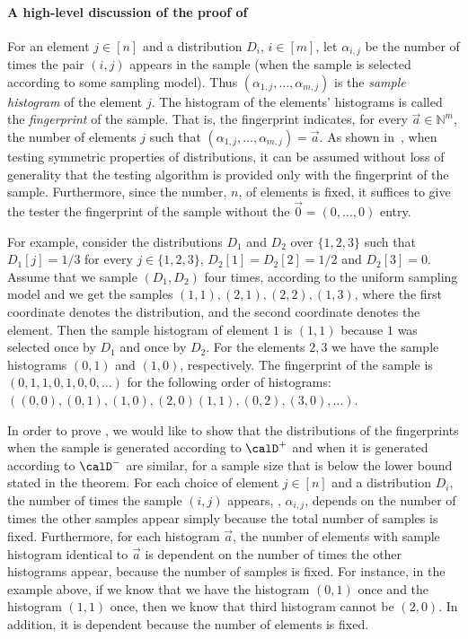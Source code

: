 \paragraph{A high-level discussion of the proof of }
For an element $j \in [n]$ and a distribution $D_i$,
$i \in[m]$, let $\alpha_{i,j}$ be the number of times the pair $(i,j)$ appears in the sample
(when the sample is selected according to some sampling model).
Thus $(\alpha_{1, j}, \ldots, \alpha_{m, j})$ is the \emph{sample histogram} of the element $j$.
The histogram of the elements' histograms is called the
\emph{fingerprint} of the sample. That is, the fingerprint indicates,
for every $\vec{a} \in \mathbb{N}^m$, the number of elements $j$ such
that $(\alpha_{1, j}, \ldots, \alpha_{m, j}) = \vec{a}$.
\sloppy
As shown in~\cite{BFRSW-long},
%
 when testing symmetric properties of distributions, it can be assumed without loss of
generality that the testing algorithm is provided only with the
fingerprint of the sample.
%
%
Furthermore, since the number, $n$, of elements is fixed,
it suffices to give the tester the fingerprint
of the sample without the $\vec{0} = (0,\ldots,0)$ entry.

For example, consider the distributions $D_1$ and $D_2$ over $\{1,2,3\}$ such that $D_1[j] = 1/3$ for every $j\in \{1,2,3\}$, $D_2[1]=D_2[2] = 1/2$ and $D_2[3] = 0$. Assume that we sample $(D_1, D_2)$ four times, according to the uniform sampling model and we get the samples $(1,1), (2,1), (2,2), (1,3)$, where the first coordinate
denotes the distribution, and the second coordinate denotes the element.
Then the sample histogram of element $1$ is $(1,1)$ because $1$ was selected once by $D_1$ and once by $D_2$. For the elements $2,3$ we have the sample histograms $(0,1)$  and $(1,0)$, respectively. The fingerprint of the sample is $(0,1,1,0,1,0,0,\ldots)$ for the following order of histograms: $((0,0), (0,1), (1,0), (2,0) (1,1), (0,2), (3,0), \ldots)$.

%
\smallskip
In order to prove , we would like to show that
the distributions of the fingerprints when the sample is generated according
to $\calD^+$ and when it is generated according to $\calD^-$ are similar,
for a sample size that is below the lower bound stated in the theorem.
%
%
For each choice of
element $j\in [n]$ and a distribution $D_i$, %
the number of times  the sample $(i,j)$ appears, \ie, $\alpha_{i,j}$,
depends on the number of times the other samples appear simply because
the total number of samples is fixed.
Furthermore,
%
for each histogram $\vec{a}$,
the number of elements with sample histogram identical to $\vec{a}$
is dependent on the number of times the other histograms appear,
because the number of samples is fixed.
For instance, in the example above, if we know that we have the
histogram $(0,1)$ once and the histogram $(1,1)$ once,
 then we know that third histogram cannot be $(2,0)$. In addition,
it is dependent because the number of elements is fixed.

